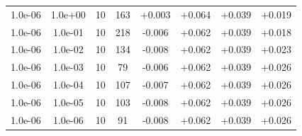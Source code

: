 \documentclass[11pt,a4paper]{article}
\begin{document}
\begin{table}
{\begin{tabular}{*{8}c}
 1.0e-06 	 & 1.0e+00 	 & 10 & 163 	 & +0.003 & +0.064 & +0.039 & +0.019 \\ 
 1.0e-06 	 & 1.0e-01 	 & 10 & 218 	 & -0.006 & +0.062 & +0.039 & +0.018 \\ 
 1.0e-06 	 & 1.0e-02 	 & 10 & 134 	 & -0.008 & +0.062 & +0.039 & +0.023 \\ 
 1.0e-06 	 & 1.0e-03 	 & 10 & 79 	 & -0.006 & +0.062 & +0.039 & +0.026 \\ 
 1.0e-06 	 & 1.0e-04 	 & 10 & 107 	 & -0.007 & +0.062 & +0.039 & +0.026 \\ 
 1.0e-06 	 & 1.0e-05 	 & 10 & 103 	 & -0.008 & +0.062 & +0.039 & +0.026 \\ 
 1.0e-06 	 & 1.0e-06 	 & 10 & 91 	 & -0.008 & +0.062 & +0.039 & +0.026 \\  
\end{tabular}}
\label{Tab::1}
\end{table} 
\end{document}
